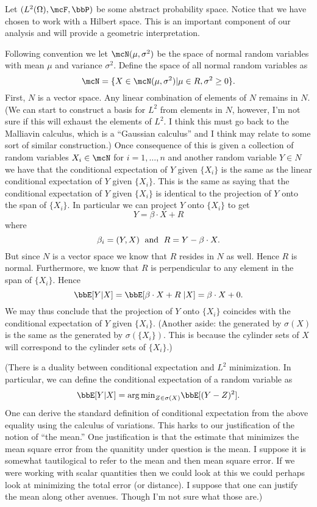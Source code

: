 \documentclass{report}
\begin{document}
Let $(L^2(\Omega), \mcF, \bbP)$ be some abstract probability space.  Notice that we have chosen to work with a Hilbert space.  This is an important component of our analysis and will provide a geometric interpretation.

Following convention we let $\mcN(\mu, \sigma^2)$ be the space of normal random variables with mean $\mu$ and variance $\sigma^2$.  Define the space of all normal random variables as
\[
\mcN = \{ X \in \mcN(\mu, \sigma^2) | \mu \in R, \sigma^2 \geq 0 \}.
\]
First, $N$ is a vector space.  Any linear combination of elements of $N$ remains in $N$.  (We can start to construct a basis for $L^2$ from elements in $N$, however, I'm not sure if this will exhaust the elements of $L^2$.  I think this must go back to the Malliavin calculus, which is a ``Gaussian calculus'' and I think may relate to some sort of similar construction.)  Once consequence of this is given a collection of random variables $X_i \in \mcN$ for $i = 1, \ldots, n$ and another random variable $Y \in N$ we have that the conditional expectation of $Y$ given $\{X_i\}$ is the same as the linear conditional expectation of $Y$ given $\{X_i\}$.  This is the same as saying that the conditional expectation of $Y$ given $\{X_i\}$ is identical to the projection of $Y$ onto the span of $\{X_i\}$.  In particular we can project $Y$ onto $\{X_i\}$ to get
\[
Y = \beta \cdot X + R
\]
where
\[
\beta_i = (Y,X) \; \textmd{ and } \; R = Y - \beta \cdot X.
\]
But since $N$ is a vector space we know that $R$ resides in $N$ as well.  Hence $R$ is normal.  Furthermore, we know that $R$ is perpendicular to any element in the span of $\{X_i\}$.  Hence
\[
\bbE[Y | X ] = \bbE[\beta \cdot X + R \; | X] = \beta \cdot X + 0.
\]
We may thus conclude that the projection of $Y$ onto $\{X_i\}$ coincides with the conditional expectation of $Y$ given $\{X_i\}$.
(Another aside: the \sigalg generated by $\sigma(X)$ is the same as the \sigalg generated by $\sigma(\{X_i\})$.  This is because the cylinder sets of $X$ will correspond to the cylinder sets of $\{X_i\}$.)

(There is a duality between conditional expectation and $L^2$ minimization.  In particular, we can define the conditional expectation of a random variable as
\[
\bbE[Y | X] = {\arg \min}_{Z \in \sigma(X)} \bbE[ (Y - Z)^2 ].
\]
One can derive the standard definition of conditional expectation from the above equality using the calculus of variations.  This harks to our justification of the notion of ``the mean.'' One justification is that the estimate that minimizes the mean square error from the quanitity under question is the mean.  I suppose it is somewhat tautilogical to refer to the mean and then mean square error.  If we were working with scalar quantities then we could look at this we could perhaps look at minimizing the total error (or distance).  I suppose that one can justify the mean along other avenues.  Though I'm not sure what those are.)
\end{document}
